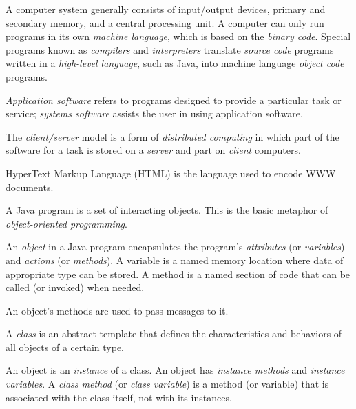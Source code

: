 \label{summaryof-important-points}
\begin{SMBL}
\item A computer system generally consists of input/output devices,
primary and secondary memory, and a central processing unit.  A
computer can only run programs in its own {\it machine language},
which is based on the {\it binary code}. Special programs known as
{\it compilers} and {\it interpreters} translate {\it source code}
programs written in a {\it high-level language}, such as Java, into
machine language {\it object code} programs.

\item {\it Application software} refers to programs designed to
provide a particular task or service; {\it systems software} assists
the user in using application software.

\item The {\it client/server} model is a form of {\it distributed
computing} in which part of the software for a task is stored on a
{\it server} and part on {\it client} computers.

\item  HyperText Markup Language (HTML) is the language used to
encode WWW documents.

\item A Java program is a set of interacting objects.  This is the
basic metaphor of {\it object-oriented programming}.

\item An {\em object} in a Java program encapsulates the program's
{\em attributes} (or {\em variables}) and {\em actions} (or {\em
methods}).  A variable is a named memory location where data of
appropriate type can be stored. A method is a named section of code
that can be called (or invoked) when needed.  

\item An object's methods are used to pass messages to it. 

\item A {\em class} is an abstract template that defines the
characteristics and behaviors of all objects of a certain type.

\item An object is an {\em instance} of a class. An object has {\em
instance methods} and {\em instance variables}. A {\em class method}
(or {\em class variable}) is a method (or variable) that is associated
with the class itself, not with its instances.


\end{SMBL}
